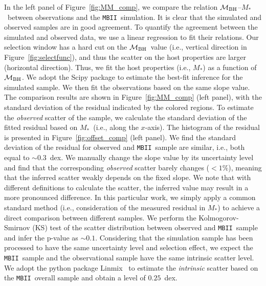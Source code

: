 \documentclass[twocolumn,trackchanges]{aastex63}
\newcommand{\mbh}{$\mathcal M_{\rm BH}$}
\newcommand{\mstar}{{$M_*$}}
\newcommand{\mbii}{\texttt{MBII}}
\newcommand{\blue}[1]{{{#1}}}
\newcommand{\pink}[1]{{{#1}}}
\begin{document}
In the left panel of Figure~\ref{fig:MM_comp}, we compare the relation \mbh--\mstar~between observations and the \mbii\ simulation. It is clear that the simulated and observed samples are in good agreement. 
\blue{To quantify the agreement between the simulated and observed data, we use a linear regression to fit their relations. Our selection window has a hard cut on the \mbh\ value (i.e., vertical direction in Figure~\ref{fig:selectfunc}), and thus the scatter on the host properties are larger (horizontal direction). Thus, we fit the host properties (i.e., \mstar) as a function of \mbh. We adopt the {\sc Scipy} package to estimate the best-fit inference for the simulated sample. We then fit the observations based on the same slope value. The comparison results are shown in Figure~\ref{fig:MM_comp} (left panel), with the standard deviation of the residual indicated by the colored regions.}
\pink{To estimate the {\it observed} scatter of the sample, we calculate the standard deviation of the fitted residual based on \mstar\ (i.e., along the $x$-axis).} \blue{The histogram of the residual is presented in Figure~\ref{fig:offset_comp} (left panel). We find the standard deviation of the residual for observed and \mbii\ sample are similar, i.e., both equal to $\sim0.3$~dex.} \pink{We manually change the slope value by its uncertainty level and find that the corresponding {\it observed} scatter barely changes ($<1\%$), meaning that the inferred scatter weakly depends on the fixed slope. We note that with different definitions to calculate the scatter, the inferred value may result in a more pronounced difference. In this particular work, we simply apply a common standard method (i.e., consideration of the measured residual in \mstar) to achieve a direct comparison between different samples.} \blue{We perform the Kolmogorov-Smirnov (KS) test of the scatter distribution between observed and \mbii\ sample and infer the p-value as $\sim0.1$. Considering that the simulation sample has been processed to have the same uncertainty level and selection effect, we expect the \mbii\ sample and the observational sample have the same intrinsic scatter level. We adopt the python package {\sc Linmix}~\citep{Kelly2007} to estimate the {\it intrinsic} scatter based on the \mbii\ overall sample and obtain a level of $0.25$~dex.
}
\end{document}
